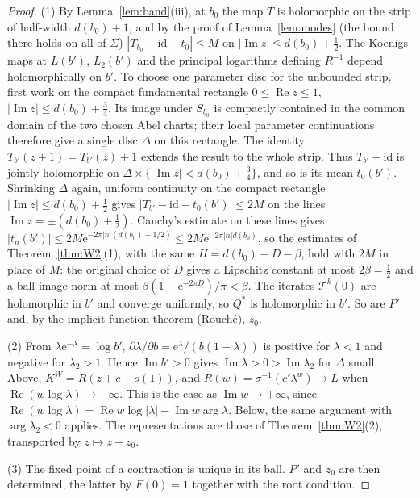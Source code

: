 \documentclass[11pt]{amsart}
\theoremstyle{definition}
\newcommand{\Rr}{R}
\newcommand{\Kk}{K}
\newcommand{\eee}{\mathrm{e}}
\begin{document}
\begin{proof}
(1) By Lemma~\ref{lem:band}(iii), at $b_0$ the map $T$ is holomorphic on the
strip of half-width $d(b_0)+1$, and by the proof of Lemma~\ref{lem:modes}
(the bound there holds on all of $\Sigma$) $|T_{b_0}-\mathrm{id}-t_0|\le M$ on
$|\operatorname{Im}z|\le d(b_0)+\tfrac12$.  The Koenigs maps at $L(b')$, $L_2(b')$ and the principal logarithms
defining $\Rr^{-1}$ depend holomorphically on $b'$.  To choose one
parameter disc for the unbounded strip, first work on the compact fundamental
rectangle $0\le\operatorname{Re}z\le1$,
$|\operatorname{Im}z|\le d(b_0)+\tfrac34$.  Its image under $S_{b_0}$
is compactly contained in the common domain of the two chosen Abel charts;
their local parameter continuations therefore give a single disc $\Delta$
on this rectangle.  The identity $T_{b'}(z+1)=T_{b'}(z)+1$ extends the
result to the whole strip.  Thus $T_{b'}-\mathrm{id}$ is jointly
holomorphic on $\Delta\times\{|\operatorname{Im}z|<d(b_0)+\tfrac34\}$, and so is
its mean $t_0(b')$.  Shrinking $\Delta$ again, uniform continuity on the compact
rectangle $|\operatorname{Im}z|\le d(b_0)+\tfrac12$ gives
$|T_{b'}-\mathrm{id}-t_0(b')|\le2M$ on the lines
$\operatorname{Im}z=\pm(d(b_0)+\tfrac12)$.  Cauchy's estimate on these lines gives
$|t_n(b')|\le2M\eee^{-2\pi|n|(d(b_0)+1/2)}\le2M\eee^{-2\pi|n|d(b_0)}$, so the
estimates of Theorem~\ref{thm:W2}(1), with the same $H=d(b_0)-D-\beta$, hold
with $2M$ in place of $M$:
the original choice of $D$ gives a Lipschitz constant at most
$2\beta=\tfrac12$ and a ball-image norm at most
$\beta(1-\eee^{-2\pi D})/\pi<\beta$.  The iterates $\mathcal T^k(0)$ are holomorphic in $b'$
and converge uniformly, so $Q^*$ is holomorphic in $b'$.  So are $P'$ and,
by the implicit function theorem (Rouch\'e), $z_0$.

(2) From $\lambda\eee^{-\lambda}=\log b'$,
$\partial\lambda/\partial b=\eee^{\lambda}/(b(1-\lambda))$ is positive for
$\lambda<1$ and negative for $\lambda_2>1$.  Hence $\operatorname{Im}b'>0$
gives $\operatorname{Im}\lambda>0>\operatorname{Im}\lambda_2$ for $\Delta$
small.  Above, $\Kk^W=\Rr(z+c+o(1))$, and
$\Rr(w)=\sigma^{-1}(c'\lambda^w)\to L$ when
$\operatorname{Re}(w\log\lambda)\to-\infty$.  This is the case as
$\operatorname{Im}w\to+\infty$, since
$\operatorname{Re}(w\log\lambda)=\operatorname{Re}w\log|\lambda|-\operatorname{Im}w\arg\lambda$.
Below, the same argument with $\arg\lambda_2<0$ applies.  The representations
are those of Theorem~\ref{thm:W2}(2), transported by $z\mapsto z+z_0$.

(3) The fixed point of a contraction is unique in its ball.  $P'$ and $z_0$
are then determined, the latter by $F(0)=1$ together with the root
condition.
\end{proof}
\end{document}
